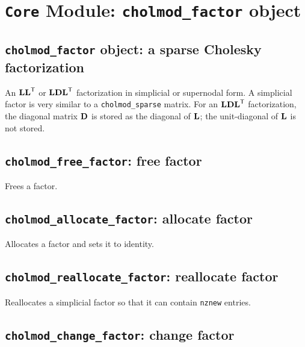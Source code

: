 \documentclass[11pt]{article}
\newcommand{\m}[1]{{\bf{#1}}}       %
\newcommand{\tr}{^{\sf T}}          %
\begin{document}
\newpage \section{{\tt Core} Module: {\tt cholmod\_factor} object}
\label{cholmod_factor}

\subsection{{\tt cholmod\_factor} object: a sparse Cholesky factorization}


An $\m{LL}\tr$ or $\m{LDL}\tr$ factorization in simplicial or supernodal form.
A simplicial factor is very similar to a {\tt cholmod\_sparse} matrix.
For an $\m{LDL}\tr$ factorization, the diagonal matrix $\m{D}$ is stored
as the diagonal of $\m{L}$; the unit-diagonal of $\m{L}$ is not stored.

\newpage \subsection{{\tt cholmod\_free\_factor}: free factor}


Frees a factor.

\subsection{{\tt cholmod\_allocate\_factor}: allocate factor}


Allocates a factor and sets it to identity.

\subsection{{\tt cholmod\_reallocate\_factor}: reallocate factor}


Reallocates a simplicial factor so that it can contain {\tt nznew} entries.

\newpage \subsection{{\tt cholmod\_change\_factor}: change factor}
\end{document}
